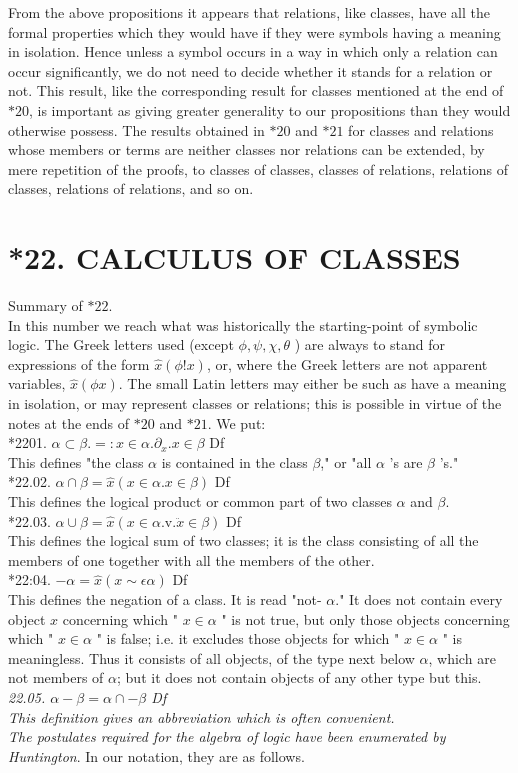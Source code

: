 \documentclass[10pt]{article}
\begin{document}
From the above propositions it appears that relations, like classes, have all the formal properties which they would have if they were symbols having a meaning in isolation. Hence unless a symbol occurs in a way in which only a relation can occur significantly, we do not need to decide whether it stands for a relation or not. This result, like the corresponding result for classes mentioned at the end of $* 20$, is important as giving greater generality to our propositions than they would otherwise possess. The results obtained in $* 20$ and $* 21$ for classes and relations whose members or terms are neither classes nor relations can be extended, by mere repetition of the proofs, to classes of classes, classes of relations, relations of classes, relations of relations, and so on.

\section*{*22. CALCULUS OF CLASSES}
Summary of $* 22$.\\
In this number we reach what was historically the starting-point of symbolic logic. The Greek letters used (except $\phi, \psi, \chi, \theta$ ) are always to stand for expressions of the form $\hat{x}(\phi!x)$, or, where the Greek letters are not apparent variables, $\hat{x}(\phi x)$. The small Latin letters may either be such as have a meaning in isolation, or may represent classes or relations; this is possible in virtue of the notes at the ends of $* 20$ and $* 21$. We put:\\
*2201. $\alpha \subset \beta .=: x \in \alpha . \partial_{x} . x \in \beta$ Df\\
This defines "the class $\alpha$ is contained in the class $\beta$," or "all $\alpha$ 's are $\beta$ 's."\\
*22.02. $\alpha \cap \beta=\widehat{x}(x \in \alpha . x \in \beta)$ Df\\
This defines the logical product or common part of two classes $\alpha$ and $\beta$.\\
*22.03. $\alpha \cup \beta=\hat{x}(x \in \alpha . \mathrm{v} . \ddot{x} \in \beta)$ Df\\
This defines the logical sum of two classes; it is the class consisting of all the members of one together with all the members of the other.\\
*22:04. $-\alpha=\widehat{x}(x \sim \epsilon \alpha)$ Df\\
This defines the negation of a class. It is read "not- $\alpha$." It does not contain every object $x$ concerning which " $x \in \alpha$ " is not true, but only those objects concerning which " $x \in \alpha$ " is false; i.e. it excludes those objects for which " $x \in \alpha$ " is meaningless. Thus it consists of all objects, of the type next below $\alpha$, which are not members of $\alpha$; but it does not contain objects of any other type but this.\\
\textit{22.05. $\alpha-\beta=\alpha \cap-\beta$ Df\\
This definition gives an abbreviation which is often convenient.\\
The postulates required for the algebra of logic have been enumerated by Huntington}. In our notation, they are as follows.
\end{document}
